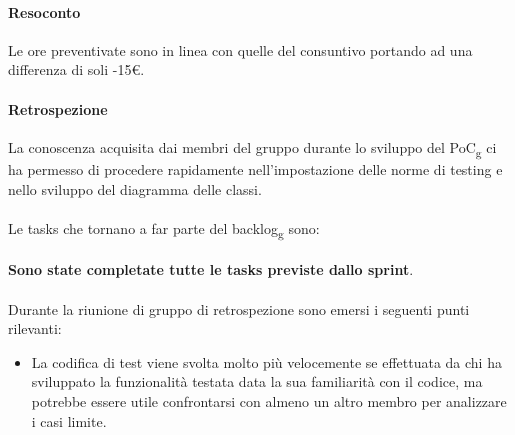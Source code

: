 \paragraph{Resoconto}
Le ore preventivate sono in linea con quelle del consuntivo portando ad una differenza di soli -15\euro.

\paragraph{Retrospezione}
La conoscenza acquisita dai membri del gruppo durante lo sviluppo del PoC\textsubscript{g} ci ha permesso di procedere rapidamente nell'impostazione delle norme di testing e nello sviluppo del diagramma delle classi. 
\\\\
Le tasks che tornano a far parte del backlog\textsubscript{g} sono:
\\\\
\textbf{Sono state completate tutte le tasks previste dallo sprint}.
\\\\
\noindent Durante la riunione di gruppo di retrospezione sono emersi i seguenti punti rilevanti:
\begin{itemize}
	\item La codifica di test viene svolta molto più velocemente se effettuata da chi ha sviluppato la funzionalità testata data la sua familiarità con il codice, ma potrebbe essere utile confrontarsi con almeno un altro membro per analizzare i casi limite.
\end{itemize}